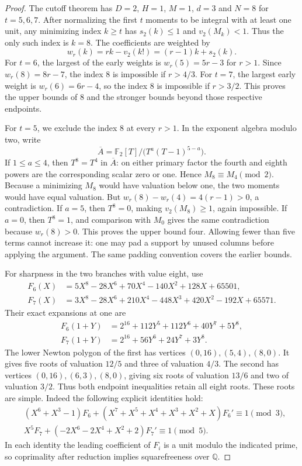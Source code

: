 \begin{proof}
The cutoff theorem has $D=2$, $H=1$, $M=1$, $d=3$ and $N=8$ for
$t=5,6,7$. After normalizing the first $t$ moments to be integral with
at least one unit, any minimizing index $k\ge t$ has
$s_2(k)\le1$ and $v_2(M_k)<1$. Thus the only such index is $k=8$.
The coefficients are weighted by
\[
 w_r(k)=rk-v_2(k!)=(r-1)k+s_2(k).
\]
For $t=6$, the largest of the early weights is $w_r(5)=5r-3$ for
$r>1$. Since $w_r(8)=8r-7$, the index $8$ is impossible if $r>4/3$.
For $t=7$, the largest early weight is $w_r(6)=6r-4$, so the index $8$
is impossible if $r>3/2$. This proves the upper bounds of $8$ and the
stronger bounds beyond those respective endpoints.

For $t=5$, we exclude the index $8$ at every $r>1$. In the exponent
algebra modulo two, write
\[
 \overline A=\mathbb F_2[T]/\bigl(T^{a}(T-1)^{5-a}\bigr).
\]
If $1\le a\le4$, then $T^8=T^4$ in $\overline A$: on either primary
factor the fourth and eighth powers are the corresponding scalar zero
or one. Hence $M_8\equiv M_4\pmod2$. Because a minimizing $M_8$ would
have valuation below one, the two moments would have equal valuation.
But $w_r(8)-w_r(4)=4(r-1)>0$, a contradiction.
If $a=5$, then $T^8=0$, making $v_2(M_8)\ge1$, again impossible.
If $a=0$, then $T^8=1$, and comparison with $M_0$ gives the same
contradiction because $w_r(8)>0$.
This proves the upper bound four. Allowing fewer than five terms cannot
increase it: one may pad a support by unused columns before applying
the argument. The same padding convention covers the earlier bounds.

For sharpness in the two branches with value eight, use
\begin{align*}
 F_6(X)&=5X^8-28X^6+70X^4-140X^2+128X+65501,\\
 F_7(X)&=3X^8-28X^6+210X^4-448X^3+420X^2-192X+65571.
\end{align*}
Their exact expansions at one are
\begin{align*}
 F_6(1+Y)&=2^{16}+112Y^5+112Y^6+40Y^7+5Y^8,\\
 F_7(1+Y)&=2^{16}+56Y^6+24Y^7+3Y^8.
\end{align*}
The lower Newton polygon of the first has vertices $(0,16),(5,4),(8,0)$.
It gives five roots of valuation $12/5$ and three of valuation $4/3$.
The second has vertices $(0,16),(6,3),(8,0)$, giving six roots of
valuation $13/6$ and two of valuation $3/2$.
Thus both endpoint inequalities retain all eight roots.
These roots are simple. Indeed the following explicit identities hold:
\[
 \begin{split}
 &(X^6+X^3-1)F_6+
 (X^7+X^5+X^4+X^3+X^2+X)F_6'\equiv1\pmod3,\\
 &X^5F_7+(-2X^6-2X^4+X^2+2)F_7'\equiv1\pmod5.
 \end{split}
\]
In each identity the leading coefficient of $F_i$ is a unit modulo the
indicated prime, so coprimality after reduction implies squarefreeness
over $\mathbb Q$.


\end{proof}
